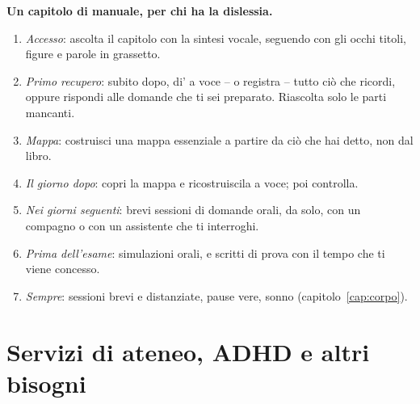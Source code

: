 \begin{inpratica}
\textbf{Un capitolo di manuale, per chi ha la dislessia.}
\begin{enumerate}
  \item \emph{Accesso}: ascolta il capitolo con la sintesi vocale,
        seguendo con gli occhi titoli, figure e parole in grassetto.
  \item \emph{Primo recupero}: subito dopo, di' a voce -- o registra -- tutto ciò che ricordi, oppure rispondi alle domande che ti sei preparato. Riascolta solo le parti mancanti.
  \item \emph{Mappa}: costruisci una mappa essenziale a partire da ciò
        che hai detto, non dal libro.
  \item \emph{Il giorno dopo}: copri la mappa e ricostruiscila a voce;
        poi controlla.
  \item \emph{Nei giorni seguenti}: brevi sessioni di domande orali,
        da solo, con un compagno o con un assistente che ti interroghi.
  \item \emph{Prima dell'esame}: simulazioni orali, e scritti di prova
        con il tempo che ti viene concesso.
  \item \emph{Sempre}: sessioni brevi e distanziate, pause vere,
        sonno (capitolo~\ref{cap:corpo}).
\end{enumerate}
\end{inpratica}

\section{Servizi di ateneo, ADHD e altri bisogni}

